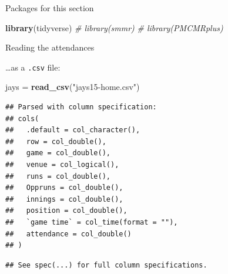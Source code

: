 \documentclass[ignorenonframetext,]{beamer}
\newenvironment{Shaded}{\begin{snugshade}}{\end{snugshade}}
\newcommand{\CommentTok}[1]{\textcolor[rgb]{0.56,0.35,0.01}{\textit{#1}}}
\newcommand{\KeywordTok}[1]{\textcolor[rgb]{0.13,0.29,0.53}{\textbf{#1}}}
\newcommand{\NormalTok}[1]{#1}
\newcommand{\StringTok}[1]{\textcolor[rgb]{0.31,0.60,0.02}{#1}}
\begin{document}
\begin{frame}[fragile]{Packages for this section}
\protect\hypertarget{packages-for-this-section-3}{}

\begin{Shaded}
\begin{Highlighting}[]
\KeywordTok{library}\NormalTok{(tidyverse)}
\CommentTok{# library(smmr)}
\CommentTok{# library(PMCMRplus)}
\end{Highlighting}
\end{Shaded}

\end{frame}

\begin{frame}[fragile]{Reading the attendances}
\protect\hypertarget{reading-the-attendances}{}

\ldots{}as a \texttt{.csv} file:

\begin{Shaded}
\begin{Highlighting}[]
\NormalTok{jays =}\StringTok{ }\KeywordTok{read_csv}\NormalTok{(}\StringTok{"jays15-home.csv"}\NormalTok{)}
\end{Highlighting}
\end{Shaded}

\begin{verbatim}
## Parsed with column specification:
## cols(
##   .default = col_character(),
##   row = col_double(),
##   game = col_double(),
##   venue = col_logical(),
##   runs = col_double(),
##   Oppruns = col_double(),
##   innings = col_double(),
##   position = col_double(),
##   `game time` = col_time(format = ""),
##   attendance = col_double()
## )
\end{verbatim}

\begin{verbatim}
## See spec(...) for full column specifications.
\end{verbatim}

\end{frame}
\end{document}
